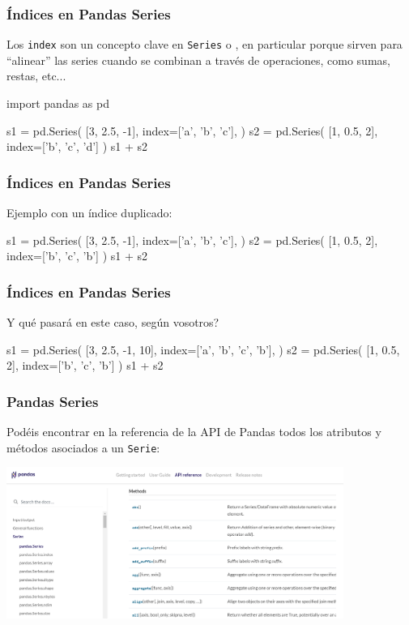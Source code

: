 \documentclass[9pt]{beamer}
\begin{document}
\begin{frame}[fragile]
 \frametitle{Índices en Pandas Series}
  Los {\tt index} son un concepto clave en {\tt Series} o , en particular porque sirven para ``alinear'' las series cuando se combinan a través de operaciones, como sumas, restas, etc...
  \begin{pyconcode}
import pandas as pd
  \end{pyconcode}
  \begin{pyconsole}
s1 = pd.Series(
        [3, 2.5, -1],
        index=['a', 'b', 'c'],
)
s2 = pd.Series(
        [1, 0.5, 2],
        index=['b', 'c', 'd']
)
s1 + s2        
  \end{pyconsole}
\end{frame}
\begin{frame}[fragile]
  \frametitle{Índices en Pandas Series}
  Ejemplo con un índice duplicado: 
  \begin{pyconsole}
s1 = pd.Series(
        [3, 2.5, -1],
        index=['a', 'b', 'c'],
)
s2 = pd.Series(
        [1, 0.5, 2],
        index=['b', 'c', 'b']
)
s1 + s2        
  \end{pyconsole}
\end{frame}
\begin{frame}[fragile]
  \frametitle{Índices en Pandas Series}
 Y qué pasará en este caso, según vosotros?
  \begin{pyconsole}
s1 = pd.Series(
        [3, 2.5, -1, 10],
        index=['a', 'b', 'c', 'b'],
)
s2 = pd.Series(
        [1, 0.5, 2],
        index=['b', 'c', 'b']
)
s1 + s2        
  \end{pyconsole}
\end{frame}
\begin{frame}
  \frametitle{Pandas Series}
  Podéis encontrar en la referencia de la API de Pandas todos los atributos y métodos asociados a un {\tt Serie}: \href{https://pandas.pydata.org/pandas-docs/stable/reference/api/pandas.Series.html}{}
        \begin{center}
        \includegraphics[width=11cm]{pandas_Series}
      \end{center}
\end{frame}
\end{document}
